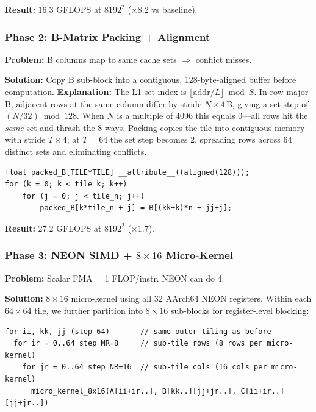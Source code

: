 \documentclass[11pt,a4paper]{article}
\begin{document}
\textbf{Result:} 16.3 GFLOPS at $8192^2$ ($\times$8.2 vs baseline).

\subsubsection{Phase 2: B-Matrix Packing + Alignment}

\textbf{Problem:} B columns map to same cache sets $\Rightarrow$ conflict misses.

\textbf{Solution:} Copy B sub-block into a contiguous, 128-byte-aligned buffer before computation.
\textbf{Explanation:}
The L1 set index is $\lfloor\text{addr}/L\rfloor \bmod S$. In row-major B, adjacent rows at the same column differ by stride $N{\times}4$\,B, giving a set step of $(N/32)\bmod 128$. When $N$ is a multiple of 4096 this equals 0---all rows hit the \emph{same} set and thrash the 8 ways.
Packing copies the tile into contiguous memory with stride $T{\times}4$; at $T{=}64$ the set step becomes 2, spreading rows across 64 distinct sets and eliminating conflicts.

\begin{lstlisting}[caption={B packing}]
float packed_B[TILE*TILE] __attribute__((aligned(128)));
for (k = 0; k < tile_k; k++)
    for (j = 0; j < tile_n; j++)
        packed_B[k*tile_n + j] = B[(kk+k)*n + jj+j];
\end{lstlisting}

\textbf{Result:} 27.2 GFLOPS at $8192^2$ ($\times$1.7).

\subsubsection{Phase 3: NEON SIMD + $8\times16$ Micro-Kernel}

\textbf{Problem:} Scalar FMA = 1 FLOP/instr. NEON can do 4.

\textbf{Solution:} $8\times16$ micro-kernel using all 32 AArch64 NEON registers.
Within each $64{\times}64$ tile, we further partition into $8{\times}16$ sub-blocks
for register-level blocking:
\begin{lstlisting}[language={},basicstyle=\ttfamily\scriptsize,frame=single,numbers=none]
for ii, kk, jj (step 64)       // same outer tiling as before
  for ir = 0..64 step MR=8     // sub-tile rows (8 rows per micro-kernel)
    for jr = 0..64 step NR=16  // sub-tile cols (16 cols per micro-kernel)
      micro_kernel_8x16(A[ii+ir..], B[kk..][jj+jr..], C[ii+ir..][jj+jr..])
\end{lstlisting}
\end{document}
